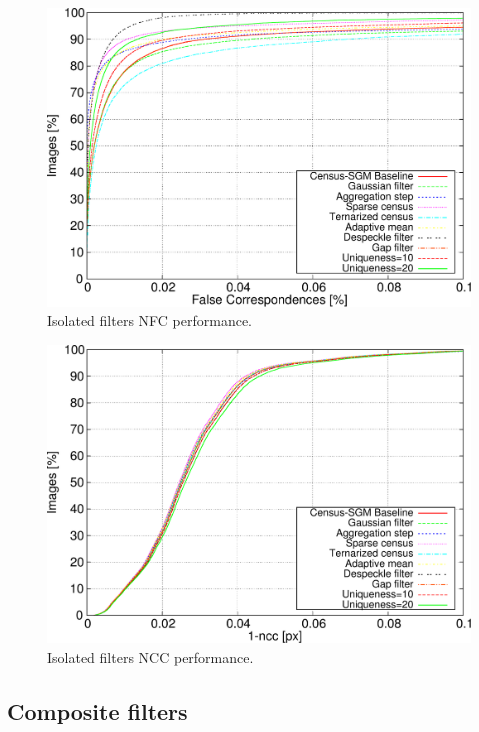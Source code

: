 \begin{figure}[p]
  \centering
  \includegraphics[width=\textwidth, height=0.4\textheight, trim=0 0 0 0,clip]{filt_nfc_perc}
  \caption{ Isolated filters NFC performance.}
  \label{fig:cp03_isolated_NFC}
\end{figure}%

\begin{figure}[p]
  \centering
  \includegraphics[width=\textwidth, height=0.4\textheight, trim=0 0 0 0,clip]{filt_ncc}
  \caption{ Isolated filters NCC performance.}
  \label{fig:cp03_isolated_NCC}
\end{figure}%

\subsection{Composite filters}\label{ch:chapter03_04_02}

